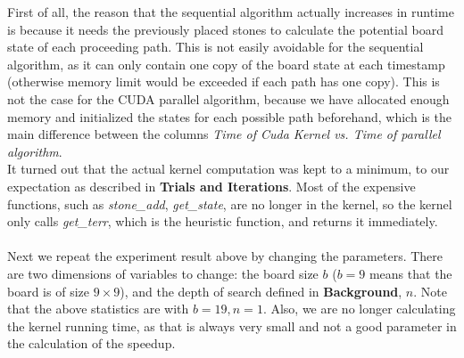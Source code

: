 \documentclass[11pt]{article}
\begin{document}
First of all, the reason that the sequential algorithm actually increases in runtime is because it needs the previously placed stones to calculate the potential board state of each proceeding path. This is not easily avoidable for the sequential algorithm, as it can only contain one copy of the board state at each timestamp (otherwise memory limit would be exceeded if each path has one copy). This is not the case for the CUDA parallel algorithm, because we have allocated enough memory and initialized the states for each possible path beforehand, which is the main difference between the columns \textit{Time of Cuda Kernel vs. Time of parallel algorithm}. \\
It turned out that the actual kernel computation was kept to a minimum, to our expectation as described in \textbf{Trials and Iterations}. Most of the expensive functions, such as \textit{stone\_add}, \textit{get\_state}, are no longer in the kernel, so the kernel only calls \textit{get\_terr}, which is the heuristic function, and returns it immediately. \\
\\
Next we repeat the experiment result above by changing the parameters. There  are two dimensions of variables to change: the board size $b$ ($b = 9$ means that the board is of size $9 \times 9$), and the depth of search defined in \textbf{Background}, $n$. Note that the above statistics are with $b = 19, n = 1$. Also, we are no longer calculating the kernel running time, as that is always very small and not a good parameter in the calculation of the speedup. 
\end{document}
